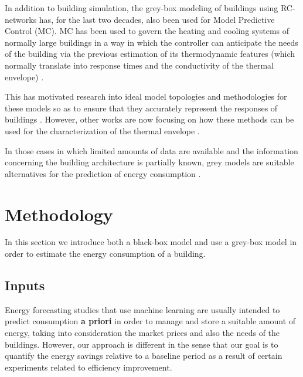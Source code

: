 \documentclass[10pt, conference, compsocconf]{IEEEtran}
\begin{document}
In addition to building simulation, the grey-box modeling of buildings using RC-networks has,  for the last two decades, also  been used for Model Predictive Control (MC). MC has been used to govern the heating and cooling systems of normally large buildings in a way in which the controller can anticipate the needs of the building via the previous estimation of its thermodynamic features (which normally translate into response times and the conductivity of the thermal envelope) \cite{coley1992second}.

This has motivated research into ideal model topologies and methodologies for these models so as to ensure that they accurately represent the responses of buildings \cite{bacher2011identifying}. However, other works are now focusing on how these methods can be used for the characterization of the thermal envelope \cite{ramallo2017reliability}.

In those cases in which limited amounts of data are available and the information concerning the building architecture is partially known, grey models are suitable alternatives for the prediction of energy consumption \cite{hamzacebi2014forecasting}.












\section{Methodology}

In this section we introduce both a black-box model and use a grey-box model in order to estimate the energy consumption of a building.

\subsection{Inputs}


Energy forecasting studies that use machine learning are usually intended to predict consumption \textbf{a priori} in order to manage and store a suitable amount of energy, taking into consideration the market prices and also the needs of the buildings. However, our approach is different in the sense that our goal is to quantify the energy savings relative to a baseline period as a result of certain experiments related to efficiency improvement. 
\end{document}
